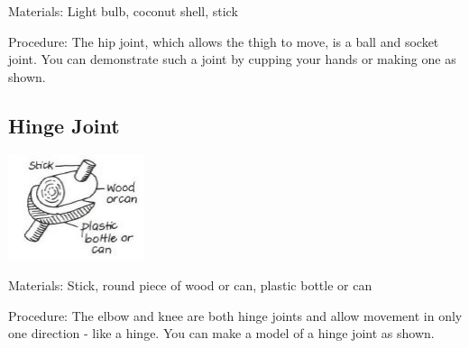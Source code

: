 \begin{multicols}{2}
\begin{description*}
\item[Materials:]{Light bulb, coconut shell, stick}
\item[Procedure:]{The hip joint, which allows the
thigh to move, is a ball and socket
joint. You can demonstrate such a
joint by cupping your hands or
making one as shown.}
\end{description*}

\subsection{Hinge Joint}

\begin{center}
\includegraphics[width=0.3\textwidth]{./img/vso/hinge-joint.jpg}
\end{center}

\begin{description*}
\item[Materials:]{Stick, round piece of wood or can, plastic bottle or can}
\item[Procedure:]{The elbow and knee are both
hinge joints and allow movement
in only one direction - like a
hinge. You can make a model of a
hinge joint as shown.}
\end{description*}


\end{multicols}
